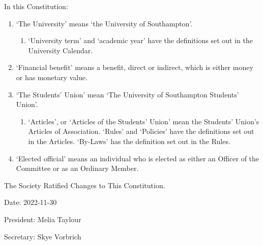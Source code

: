 \documentclass[12pt]{constitution}
\begin{document}
In this Constitution:
\begin{enumerate}
    \item `The University' means `the University of Southampton'.
    \begin{enumerate}
        \item `University term' and `academic year' have the definitions set out in the University Calendar.
    \end{enumerate}

    \item `Financial benefit' means a benefit, direct or indirect, which is either money or has monetary value.
    \item `The Students' Union' mean `The University of Southampton Students' Union'.
    \begin{enumerate}
        \item `Articles', or `Articles of the Students' Union' mean the Students' Union's Articles of Association. `Rules' and `Policies' have the definitions set out in the Articles. `By-Laws' has the definition set out in the Rules.
    \end{enumerate}
    
    \item `Elected official' means an individual who is elected as either an Officer of the Committee or as an Ordinary Member.
\end{enumerate}


\label{article:declaration}

The Society Ratified Changes to This Constitution.

Date: 2022-11-30

President: Melia Taylour 

Secretary: Skye Vorbrich
\end{document}
